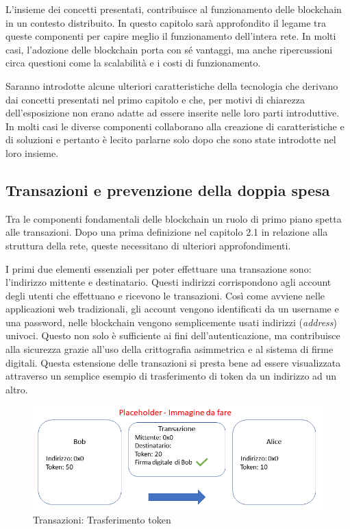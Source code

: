 L’insieme dei concetti presentati, contribuisce al funzionamento delle blockchain in un contesto distribuito. In questo capitolo sarà approfondito il legame tra queste componenti per capire meglio il funzionamento dell’intera rete. In molti casi, l’adozione delle blockchain porta con sé vantaggi, ma anche ripercussioni circa questioni come la scalabilità e i costi di funzionamento.

Saranno introdotte alcune ulteriori caratteristiche della tecnologia che derivano dai concetti presentati nel primo capitolo e che, per motivi di chiarezza dell’esposizione non erano adatte ad essere inserite nelle loro parti introduttive. In molti casi le diverse componenti collaborano alla creazione di caratteristiche e di soluzioni e pertanto è lecito parlarne solo dopo che sono state introdotte nel loro insieme.

\subsection{Transazioni e prevenzione della doppia spesa}

Tra le componenti fondamentali delle blockchain un ruolo di primo piano spetta alle transazioni. Dopo una prima definizione nel capitolo 2.1 in relazione alla struttura della rete, queste necessitano di ulteriori approfondimenti.

I primi due elementi essenziali per poter effettuare una transazione sono: l’indirizzo mittente e destinatario. Questi indirizzi corrispondono agli account degli utenti che effettuano e ricevono le transazioni. Così come avviene nelle applicazioni web tradizionali, gli account vengono identificati da un username e una password, nelle blockchain vengono semplicemente usati indirizzi (\emph{address}) univoci. Questo non solo è sufficiente ai fini dell’autenticazione, ma contribuisce alla sicurezza grazie all’uso della crittografia asimmetrica e al sistema di firme digitali. Questa estensione delle transazioni si presta bene ad essere visualizzata attraverso un semplice esempio di trasferimento di token da un indirizzo ad un altro.
\\

\begin{figure}[H]
\centering
\includegraphics[width=1\textwidth]{immagini/transazionetest.png}
\caption{Transazioni: Trasferimento token}
\label{fig:TransazioneToken}
\end{figure}

